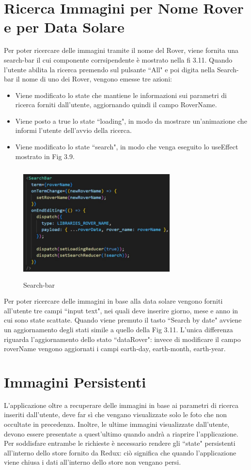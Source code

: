 \section{Ricerca Immagini per Nome Rover e per Data Solare}
Per poter ricercare delle immagini tramite il nome del Rover, viene fornita una search-bar il cui componente corrsipendente \`e mostrato nella fi 3.11. Quando l'utente abilita la ricerca premendo sul pulsante ``All" e poi digita nella Search-bar il nome di uno dei Rover, vengono emesse tre azioni:
\begin{itemize}
    \item Viene modificato lo state che mantiene le informazioni sui parametri di ricerca forniti dall'utente, aggiornando quindi il campo RoverName.
    \item Viene posto a true lo state ``loading", in modo da mostrare un'animazione che informi l'utente dell'avvio della ricerca.
    \item Viene modificato lo state ``search", in modo che venga eseguito lo useEffect mostrato in Fig 3.9.
\end{itemize}
\begin{figure}[h]
    \centering
    \includegraphics[width=8cm, height=6cm]{images/SearchBar.jpg}
    \caption[differenzeiteot]{Search-bar}
    \label{fig:Search-bar}
\end{figure}

Per poter ricercare delle immagini in base alla data solare vengono forniti all'utente tre campi ``input text", nei quali deve inserire giorno, mese e anno in cui sono state scattate.
Quando viene premuto il tasto ``Search by date" avviene un aggiornamento degli stati simile a quello della Fig 3.11. L'unica differenza riguarda l'aggiornamento dello stato ``dataRover": invece di
modificare il campo roverName vengono aggiornati i campi earth-day, earth-month, earth-year.

\section{Immagini Persistenti}
L'applicazione oltre a recuperare delle immagini in base ai parametri di ricerca inseriti dall'utente, deve far s\`i che vengano visualizzate solo le foto che non occultate in precedenza. Inoltre, le ultime immagini visualizzate dall'utente, devono essere presentate a quest'ultimo quando andr\`a a riaprire l'applicazione.
Per soddisfare entrambe le richieste \`e necessario rendere gli ``state" persistenti all'interno dello store fornito da Redux: ci\`o significa che quando l'applicazione viene chiusa i dati all'interno dello store non vengano persi.

